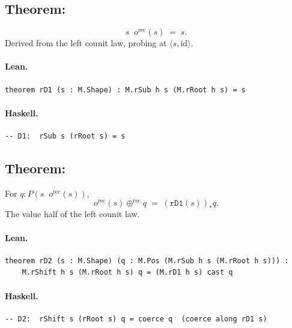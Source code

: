 \documentclass[11pt,a4paper]{article}
\begin{document}
\subsection{Theorem: }

\begin{thm}
\[
  s \mathop{\downarrow^\mathrm{rec}} o^\mathrm{rec}(s) \;=\; s.
\]
Derived from the left counit law, probing at $\langle s, \mathrm{id}\rangle$.
\end{thm}

\paragraph{Lean.}
\begin{lstlisting}[style=lean]
theorem rD1 (s : M.Shape) : M.rSub h s (M.rRoot h s) = s
\end{lstlisting}

\paragraph{Haskell.}
\begin{lstlisting}[style=haskell]
-- D1:  rSub s (rRoot s) = s
\end{lstlisting}


\subsection{Theorem: }

\begin{thm}
For $q : P(s \mathop{\downarrow^\mathrm{rec}} o^\mathrm{rec}(s))$,
\[
  o^\mathrm{rec}(s) \oplus^\mathrm{rec} q
  \;=\;
  (\mathtt{rD1}(s))_* q.
\]
The value half of the left counit law.
\end{thm}

\paragraph{Lean.}
\begin{lstlisting}[style=lean]
theorem rD2 (s : M.Shape) (q : M.Pos (M.rSub h s (M.rRoot h s))) :
    M.rShift h s (M.rRoot h s) q = (M.rD1 h s) cast q
\end{lstlisting}

\paragraph{Haskell.}
\begin{lstlisting}[style=haskell]
-- D2:  rShift s (rRoot s) q = coerce q  (coerce along rD1 s)
\end{lstlisting}
\end{document}
